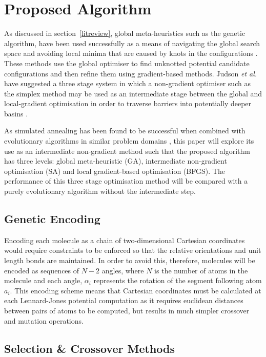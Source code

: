 \documentclass{article}
\begin{document}
\section{Proposed Algorithm} \label{proposed}

As discussed in section~\ref{litreview}, global meta-heuristics such as the
genetic algorithm, have been used successfully as a means of navigating the
global search space and avoiding local minima that are caused by knots in the
configurations \cite{PULLAN1998331, doi:10.1002/qua.560440214}. These methods
use the global optimiser to find unknotted potential candidate configurations
and then refine them using gradient-based methods. Judson \textit{et al.} have
suggested a three stage system in which a non-gradient optimiser such as the
simplex method may be used as an intermediate stage between the global and
local-gradient optimisation in order to traverse barriers into potentially
deeper basins \cite{doi:10.1002/qua.560440214}.

As simulated annealing has been found to be successful when combined with
evolutionary algorithms in similar problem domains \cite{PhysRevLett.91.080201},
this paper will explore its use as an intermediate non-gradient method such that
the proposed algorithm has three levels: global meta-heuristic (GA),
intermediate non-gradient optimisation (SA) and local gradient-based
optimisation (BFGS). The performance of this three stage optimisation method
will be compared with a purely evolutionary algorithm without the intermediate
step.

\subsection{Genetic Encoding}

Encoding each  molecule as a chain of two-dimensional Cartesian coordinates
would require constraints to be enforced so that the relative orientations and
unit length bonds are maintained. In order to avoid this, therefore, molecules
will be encoded as sequences of $N-2$ angles, where $N$ is the number of atoms
in the molecule and each angle, $\alpha_i$ represents the rotation of the
segment following atom $a_i$. This encoding scheme means that Cartesian
coordinates must be calculated at each Lennard-Jones potential computation as it
requires euclidean distances between pairs of atoms to be computed, but results
in much simpler crossover and mutation operations.

\subsection{Selection \& Crossover Methods}
\end{document}

